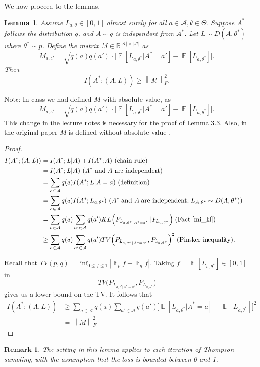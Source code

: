 \documentclass[11pt]{article}
\newtheorem{lemma}[theorem]{Lemma}
\newtheorem{remark}{Remark}[theorem]
\DeclareMathOperator*{\E}{\mathbb{E}}
\newcommand{\norm}[1]{\left\lVert#1\right\rVert}
\begin{document}
We now proceed to the lemmas.
\begin{lemma}\label{lem1}
Assume $L_{a, \theta} \in [0,1]$ almost surely for all $a \in \mathcal{A}, \theta \in \Theta$. Suppose $A^*$ follows the distribution $q$, and $A \sim q$ is independent from $A^*$. Let $L \sim D(A, \theta^*)$ where $\theta^* \sim p$. Define the matrix $M \in \mathbb{R}^{|\mathcal{A}| \times |\mathcal{A}|}$ as 
\begin{equation*}
    M_{a,a'} = \sqrt{q(a)q(a')} \cdot \Big[\E[L_{a,\theta^*} | A^* = a'] - \E[L_{a,\theta^*}]\Big].
\end{equation*}
Then 
\begin{equation*}
    I(A^*;(A,L)) \ge \norm{M}_F^2.
\end{equation*}
\end{lemma}
Note: In class we had defined $M$ with absolute value, as $$M_{a,a'} = \sqrt{q(a)q(a')} \cdot \Big|\E[L_{a,\theta^*} | A^* = a'] - \E[L_{a,\theta^*}]\Big|.$$ This change in the lecture notes is necessary for the proof of Lemma 3.3. Also, in the original paper $M$ is defined without absolute value \cite{RussoRoy}.

\begin{proof}
\begin{align*}
    I(A^*;(A,L)) & = I(A^*;L|A) + I(A^*;A) \text{ (chain rule)}\\
    & = I(A^*;L|A) \text{ ($A^*$ and $A$ are independent)} &\\
    & = \sum_{a \in \mathcal{A}}q(a)I(A^*;L|A = a) \text{ (definition)} \\
    & = \sum_{a \in \mathcal{A}}q(a)I(A^*;L_{a,\theta^*}) \text{ ($A^*$ and $A$ are independent; $L_{A, \theta^*} \sim D(A, \theta^*)$)} \\
    & = \sum_{a \in \mathcal{A}}q(a) \sum_{a' \in \mathcal{A}} q(a') KL\Big(P_{L_{a, \theta^*|A^* = a'}} || P_{L_{a,\theta^*}}\Big) \text{ (Fact \ref{mi_kl})} \\
    & \ge \sum_{a \in \mathcal{A}}q(a) \sum_{a' \in \mathcal{A}}q(a')TV\Big(P_{L_{a, \theta^*|A^* = a'}}, P_{L_{a,\theta^*}}\Big)^2 \text{ (Pinsker inequality)}.
\end{align*}

Recall that $TV(p,q) = \inf_{0 \le f \le 1} |\E_p f - \E_q f|$. Taking $f = \E[L_{a, \theta^*}] \in [0,1]$ in
\begin{equation*}
    TV\Big(P_{L_{a, \theta^*|A^* = a'}}, P_{L_{a,\theta^*}}\Big)
\end{equation*}
gives us a lower bound on the TV. It follows that
\begin{align*}
    I(A^*;(A,L)) & \ge \sum_{a \in \mathcal{A}}q(a) \sum_{a' \in \mathcal{A}} q(a') \Big[\E[L_{a,\theta^*}|A^* = a] - \E[L_{a,\theta^*}]\Big]^2 \\
    & = \norm{M}_F^2
\end{align*}
\end{proof}
\begin{remark}
The setting in this lemma applies to each iteration of Thompson sampling, with the assumption that the loss is bounded between 0 and 1. 
\end{remark}
\end{document}
